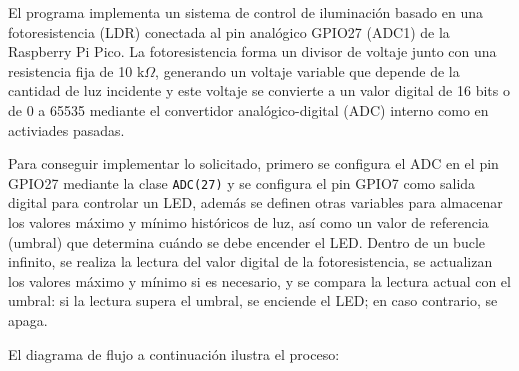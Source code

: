 \documentclass[letterpaper,12pt]{article}
\begin{document}
El programa implementa un sistema de control de iluminación basado en una fotoresistencia (LDR) conectada al pin analógico GPIO27 (ADC1) de la Raspberry Pi Pico. La fotoresistencia forma un divisor de voltaje junto con una resistencia fija de 10 k$\Omega$, generando un voltaje variable que depende de la cantidad de luz incidente y este voltaje se convierte a un valor digital de 16 bits o de 0 a 65535 mediante el convertidor analógico-digital (ADC) interno como en activiades pasadas.

Para conseguir implementar lo solicitado, primero se configura el ADC en el pin GPIO27 mediante la clase \texttt{ADC(27)} y se configura el pin GPIO7 como salida digital para controlar un LED, además se definen otras variables para almacenar los valores máximo y mínimo históricos de luz, así como un valor de referencia (umbral) que determina cuándo se debe encender el LED. Dentro de un bucle infinito, se realiza la lectura del valor digital de la fotoresistencia, se actualizan los valores máximo y mínimo si es necesario, y se compara la lectura actual con el umbral: si la lectura supera el umbral, se enciende el LED; en caso contrario, se apaga.

El diagrama de flujo a continuación ilustra el proceso:
\end{document}
